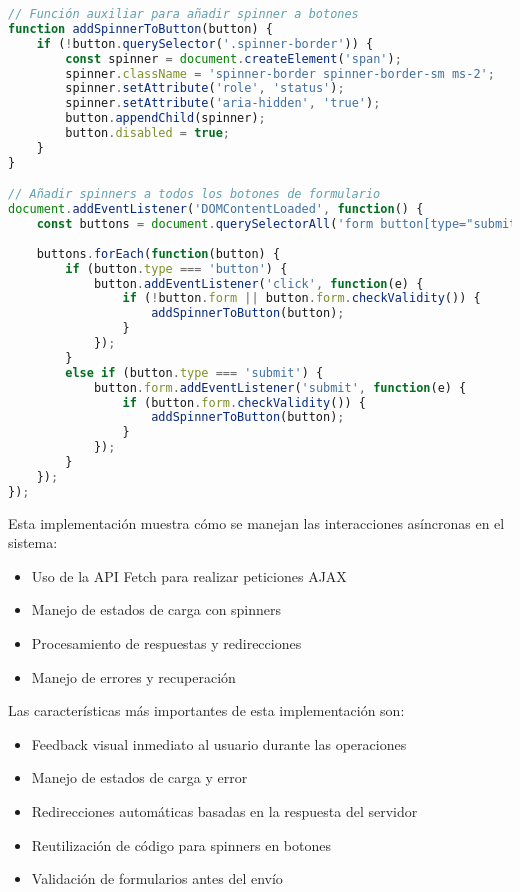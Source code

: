 \begin{lstlisting}[language=JavaScript, caption=Implementación de llamadas AJAX para formularios y actualizaciones]
// Función auxiliar para añadir spinner a botones
function addSpinnerToButton(button) {
    if (!button.querySelector('.spinner-border')) {
        const spinner = document.createElement('span');
        spinner.className = 'spinner-border spinner-border-sm ms-2';
        spinner.setAttribute('role', 'status');
        spinner.setAttribute('aria-hidden', 'true');
        button.appendChild(spinner);
        button.disabled = true;
    }
}

// Añadir spinners a todos los botones de formulario
document.addEventListener('DOMContentLoaded', function() {
    const buttons = document.querySelectorAll('form button[type="submit"], form button[type="button"]');
    
    buttons.forEach(function(button) {
        if (button.type === 'button') {
            button.addEventListener('click', function(e) {
                if (!button.form || button.form.checkValidity()) {
                    addSpinnerToButton(button);
                }
            });
        }
        else if (button.type === 'submit') {
            button.form.addEventListener('submit', function(e) {
                if (button.form.checkValidity()) {
                    addSpinnerToButton(button);
                }
            });
        }
    });
});
\end{lstlisting}

Esta implementación muestra cómo se manejan las interacciones asíncronas en el sistema:

\begin{itemize}
    \item Uso de la API Fetch para realizar peticiones AJAX
    \item Manejo de estados de carga con spinners
    \item Procesamiento de respuestas y redirecciones
    \item Manejo de errores y recuperación
\end{itemize}

Las características más importantes de esta implementación son:

\begin{itemize}
    \item Feedback visual inmediato al usuario durante las operaciones
    \item Manejo de estados de carga y error
    \item Redirecciones automáticas basadas en la respuesta del servidor
    \item Reutilización de código para spinners en botones
    \item Validación de formularios antes del envío
\end{itemize}

